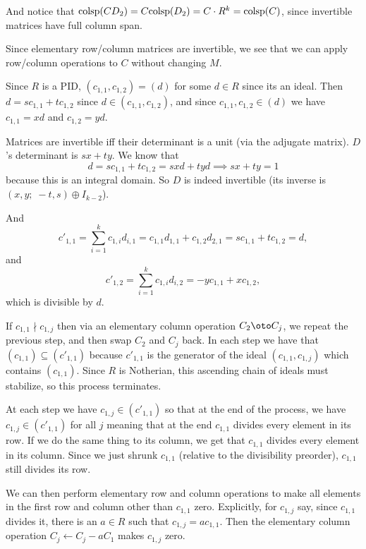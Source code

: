     And notice that ${\rm colsp}(CD_2)=C{\rm colsp}(D_2)=C\cdot R^k={\rm colsp}(C)$, since invertible matrices have full column span.

    Since elementary row/column matrices are invertible, we see that we can apply row/column operations to $C$ without changing $M$.

    \item Since $R$ is a PID, $(c_{1,1},c_{1,2})=(d)$ for some $d\in R$ since its an ideal.
    Then $d=sc_{1,1}+tc_{1,2}$ since $d\in(c_{1,1},c_{1,2})$, and since $c_{1,1},c_{1,2}\in(d)$ we have $c_{1,1}=xd$ and $c_{1,2}=yd$.

    Matrices are invertible iff their determinant is a unit (via the adjugate matrix).
    $D$'s determinant is $sx+ty$.
    We know that
    $$ d = sc_{1,1} + tc_{1,2} = sxd + tyd \implies sx + ty = 1 $$
    because this is an integral domain.
    So $D$ is indeed invertible (its inverse is $(x,y;\;-t,s)\oplus I_{k-2}$).

    And
    $$ c'_{1,1} = \sum_{i=1}^k c_{1,i}d_{i,1} = c_{1,1}d_{1,1} + c_{1,2}d_{2,1} = sc_{1,1} + tc_{1,2} = d , $$
    and
    $$ c'_{1,2} = \sum_{i=1}^k c_{1,i}d_{i,2} = -yc_{1,1} + xc_{1,2} , $$
    which is divisible by $d$.

    \item If $c_{1,1}\nmid c_{1,j}$ then via an elementary column operation $C_2\oto C_j$, we repeat the previous step, and then swap $C_2$ and $C_j$ back.
    In each step we have that $(c_{1,1})\subseteq(c'_{1,1})$ because $c'_{1,1}$ is the generator of the ideal $(c_{1,1},c_{1,j})$ which contains $(c_{1,1})$.
    Since $R$ is Notherian, this ascending chain of ideals must stabilize, so this process terminates.

    At each step we have $c_{1,j}\in(c'_{1,1})$ so that at the end of the process, we have $c_{1,j}\in(c'_{1,1})$ for all $j$ meaning that at the end $c_{1,1}$ divides
    every element in its row.
    If we do the same thing to its column, we get that $c_{1,1}$ divides every element in its column.
    Since we just shrunk $c_{1,1}$ (relative to the divisibility preorder), $c_{1,1}$ still divides its row.

    \item We can then perform elementary row and column operations to make all elements in the first row and column other than $c_{1,1}$ zero.
    Explicitly, for $c_{1,j}$ say, since $c_{1,1}$ divides it, there is an $a\in R$ such that $c_{1,j}=ac_{1,1}$.
    Then the elementary column operation $C_j\leftarrow C_j-aC_1$ makes $c_{1,j}$ zero.

